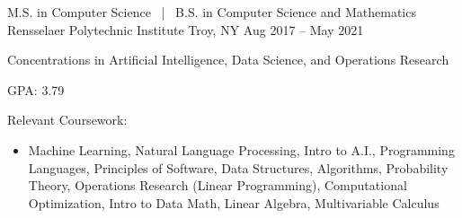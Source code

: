 


\begin{cventries}

  \cventry
  {M.S. in Computer Science \, | \, B.S. in Computer Science and Mathematics}
  {Rensselaer Polytechnic Institute}
  {Troy, NY}
  {Aug 2017 -- May 2021}
  {
    \begin{cvitems}
      \item Concentrations in Artificial Intelligence, Data Science, and Operations Research
      \item GPA: 3.79
      \item Relevant Coursework:
      \begin{itemize}
        \item Machine Learning, Natural Language Processing, Intro to A.I., Programming Languages, Principles of Software, Data Structures, Algorithms, Probability Theory, Operations Research (Linear Programming), Computational Optimization, Intro to Data Math, Linear Algebra, Multivariable Calculus
      \end{itemize}
    \end{cvitems}
  }


\end{cventries}